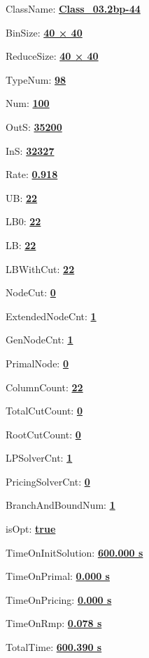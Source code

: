 \documentclass[11pt]{article}
\begin{document}
\pagestyle{empty}


ClassName: \underline{\textbf{Class_03.2bp-44}}
\par
BinSize: \underline{\textbf{40 × 40}}
\par
ReduceSize: \underline{\textbf{40 × 40}}
\par
TypeNum: \underline{\textbf{98}}
\par
Num: \underline{\textbf{100}}
\par
OutS: \underline{\textbf{35200}}
\par
InS: \underline{\textbf{32327}}
\par
Rate: \underline{\textbf{0.918}}
\par
UB: \underline{\textbf{22}}
\par
LB0: \underline{\textbf{22}}
\par
LB: \underline{\textbf{22}}
\par
LBWithCut: \underline{\textbf{22}}
\par
NodeCut: \underline{\textbf{0}}
\par
ExtendedNodeCnt: \underline{\textbf{1}}
\par
GenNodeCnt: \underline{\textbf{1}}
\par
PrimalNode: \underline{\textbf{0}}
\par
ColumnCount: \underline{\textbf{22}}
\par
TotalCutCount: \underline{\textbf{0}}
\par
RootCutCount: \underline{\textbf{0}}
\par
LPSolverCnt: \underline{\textbf{1}}
\par
PricingSolverCnt: \underline{\textbf{0}}
\par
BranchAndBoundNum: \underline{\textbf{1}}
\par
isOpt: \underline{\textbf{true}}
\par
TimeOnInitSolution: \underline{\textbf{600.000 s}}
\par
TimeOnPrimal: \underline{\textbf{0.000 s}}
\par
TimeOnPricing: \underline{\textbf{0.000 s}}
\par
TimeOnRmp: \underline{\textbf{0.078 s}}
\par
TotalTime: \underline{\textbf{600.390 s}}
\par
\newpage


\end{document}

